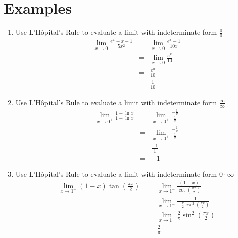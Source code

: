 \documentclass{article}
\begin{document}
\section*{Examples}
\begin{enumerate}
    \item Use L'Hôpital's Rule to evaluate a limit with indeterminate form $\frac{0}{0}$
        \begin{eqnarray}
            \lim_{x \to 0}{\frac{e^x - x - 1}{5x^2}} &=& \lim_{x \to 0}{\frac{e^x - 1}{10x}} \\
                                                     &=& \lim_{x \to 0}{\frac{e^x}{10}} \\
                                                     &=& \frac{e^0}{10} \\
                                                     &=& \frac{1}{10}
        \end{eqnarray}
    \item Use L'Hôpital's Rule to evaluate a limit with indeterminate form $\frac{\infty}{\infty}$
        \begin{eqnarray}
            \lim_{x \to 0^+}{\frac{1 - \ln{x}}{1 + \ln{x}}} &=& \lim_{x \to 0^+}{\frac{-\frac{1}{x}}{\frac{1}{x}}} \\
                                                            &=& \lim_{x \to 0^+}{\frac{-\frac{1}{x}}{\frac{1}{x}}} \\
                                                            &=& \frac{-1}{1} \\
                                                            &=& -1
        \end{eqnarray}
    \item Use L'Hôpital's Rule to evaluate a limit with indeterminate form $0 \cdot \infty$
        \begin{eqnarray}
            \lim_{x \to 1^-}{\left(1 - x\right)\tan{\left(\frac{\pi x}{2}\right)}} &=& \lim_{x \to 1^-}{\frac{\left(1 - x\right)}{\cot{\left(\frac{\pi x}{2}\right)}}} \\
                                                                                   &=& \lim_{x \to 1^-}{\frac{-1}{-\frac{\pi}{2}\csc^2{\left(\frac{\pi x}{2}\right)}}} \\
                                                                                   &=& \lim_{x \to 1^-}{\frac{2}{\pi}\sin^2{\left(\frac{\pi x}{2}\right)}} \\
                                                                                   &=& \frac{2}{\pi}

\end{eqnarray}
\end{enumerate}
\end{document}
